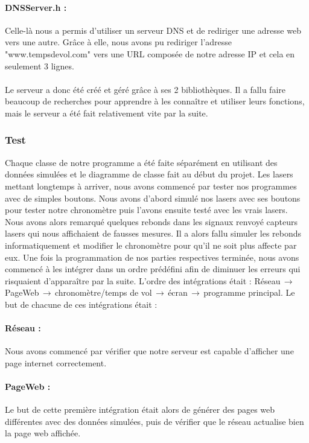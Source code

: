 \paragraph{DNSServer.h :}
Celle-là nous a permis d'utiliser un serveur DNS et de rediriger une adresse web vers une autre. Grâce à elle, nous avons pu rediriger l'adresse "www.tempsdevol.com" vers une URL composée de notre adresse IP et cela en seulement 3 lignes.
\paragraph{}
Le serveur a donc été créé et géré grâce à ses 2 bibliothèques. Il a fallu faire beaucoup de recherches pour apprendre à les connaître et utiliser leurs fonctions, mais le serveur a été fait relativement vite par la suite.

\subsubsection{Test}
Chaque classe de notre programme a été faite séparément en utilisant des données simulées et le diagramme de classe fait au début du projet. Les lasers mettant longtemps à arriver, nous avons commencé par tester nos programmes avec de simples boutons. Nous avons d'abord simulé nos lasers avec ses boutons pour tester notre chronomètre puis l'avons ensuite testé avec les vrais lasers. Nous avons alors remarqué quelques rebonds dans les signaux renvoyé capteurs lasers qui nous affichaient de fausses mesures. Il a alors fallu simuler les rebonds informatiquement et modifier le chronomètre pour qu'il ne soit plus affecte par eux. Une fois la programmation de nos parties respectives terminée, nous avons commencé à les intégrer dans un ordre prédéfini afin de diminuer les erreurs qui risquaient d’apparaître par la suite. L’ordre des intégrations était : Réseau$\,\to\,$PageWeb$\,\to\,$chronomètre/temps de vol$\,\to\,$écran$\,\to\,$programme principal. Le but de chacune de ces intégrations était :
\paragraph{Réseau :}
Nous avons commencé par vérifier que notre serveur est capable d’afficher une page internet correctement.
\paragraph{PageWeb :}
Le but de cette première intégration était alors de générer des pages web différentes avec des données simulées, puis de vérifier que le réseau actualise bien la page web affichée. 
